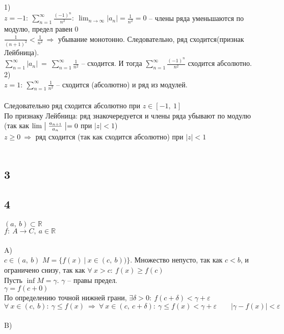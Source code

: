 		1)\\
		$z = -1:\ \sum^{\infty}_{n = 1} \frac{(-1)^n}{n^2}:\ \lim_{n \to \infty}|a_n| = \frac{1}{n^2} = 0$ -- члены ряда уменьшаются по модулю, предел равен $0$\\
		$\frac{1}{(n + 1)^2} < \frac{1}{n^2}\ \Rightarrow$ убывание монотонно. Следовательно, ряд сходится(признак Лейбница).\\
		$\sum^{\infty}_{n = 1} |a_n| \ = \ \sum^{\infty}_{n = 1} \frac{1}{n^2}$ -- сходится. И тогда $\sum^{\infty}_{n = 1} \frac{(-1)^n}{n^2}$ сходится абсолютно.\\
		2)\\
		$z = 1:\ \sum^{\infty}_{n = 1} \frac{1}{n^2}$ -- сходится (абсолютно) и ряд из модулей.\\
		\\
		Следовательно ряд сходится абсолютно при $z \in [-1,\ 1]$\\
		По признаку Лейбница: ряд знакочередуется и члены ряда убывают по модулю (так как $\lim \bigm| \frac{a_{n + 1}}{a_{n}} \bigm| = 0$ при $|z| < 1$)\\
		$z \geq 0 \ \Rightarrow$ ряд сходится (так как сходится абсолютно) при $|z| < 1$
		\\ \\
		\subsection{3}
		
		\subsection{4}
		$(a,\ b) \subset \mathbb{R}$\\
		$f:\ A \to C,\ a \in \mathbb{R}$\\
		\\
		A)\\
		$c \in (a,\ b)$
		$M = \{f(x)\ | \ x \in (c,\ b)) \}$. Множество непусто, так как $c < b$, и ограничено снизу, так как $\forall\ x > c:\ f(x) \geq f(c)$\\
		Пусть $\inf M = \gamma$. $\gamma$ -- правы предел. \\
		$\gamma = f(c + 0)$\\
		По определению точной нижней грани, $\exists \delta > 0:\ f(c + \delta) < \gamma + \varepsilon$\\
		$\forall \ x \in (c,\ b):\ \gamma \leq f(x) \ \Rightarrow \ \forall \ x \in (c,\ c + \delta):\ \gamma \leq f(x) < \gamma + \varepsilon \qquad |\gamma - f(x)| < \varepsilon$
		\\ \\
		B)\\
		\\ \\
